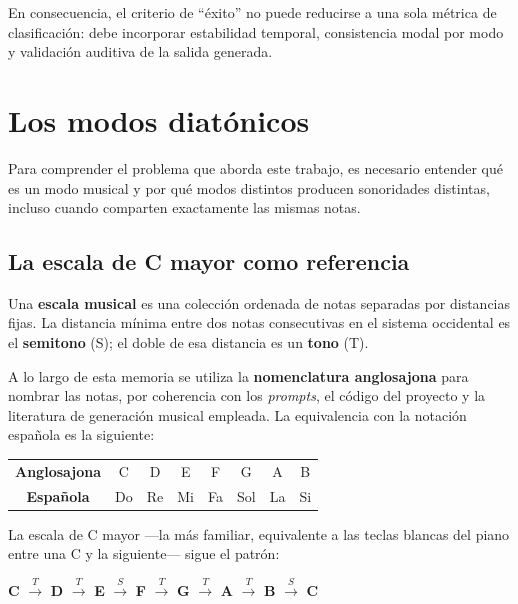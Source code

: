 \documentclass[%
    school=etsisi,%
    type=pfg,%
    degree=61CD,%
]{upm-report}
\begin{document}
En consecuencia, el criterio de ``\'exito'' no puede reducirse a una sola m\'etrica de clasificaci\'on: debe incorporar estabilidad temporal, consistencia modal por modo y validaci\'on auditiva de la salida generada.

\section{Los modos diat\'onicos}
\label{s:modos-diatonicos}

Para comprender el problema que aborda este trabajo, es necesario entender qu\'e es un modo musical y por qu\'e modos distintos producen sonoridades distintas, incluso cuando comparten exactamente las mismas notas.

\subsection{La escala de C mayor como referencia}

Una \textbf{escala musical} es una colecci\'on ordenada de notas separadas por distancias fijas. La distancia m\'inima entre dos notas consecutivas en el sistema occidental es el \textbf{semitono} (S); el doble de esa distancia es un \textbf{tono} (T).

A lo largo de esta memoria se utiliza la \textbf{nomenclatura anglosajona} para nombrar las notas, por coherencia con los \textit{prompts}, el c\'odigo del proyecto y la literatura de generaci\'on musical empleada. La equivalencia con la notaci\'on espa\~nola es la siguiente:

\begin{center}
\begin{tabular}{cccccccc}
\toprule
\textbf{Anglosajona} & C & D & E & F & G & A & B \\
\textbf{Espa\~nola}   & Do & Re & Mi & Fa & Sol & La & Si \\
\bottomrule
\end{tabular}
\end{center}

La escala de C mayor ---la m\'as familiar, equivalente a las teclas blancas del piano entre una C y la siguiente--- sigue el patr\'on:

\begin{center}
\large
\textbf{C} $\xrightarrow{\,T\,}$ \textbf{D} $\xrightarrow{\,T\,}$ \textbf{E} $\xrightarrow{\,S\,}$ \textbf{F} $\xrightarrow{\,T\,}$ \textbf{G} $\xrightarrow{\,T\,}$ \textbf{A} $\xrightarrow{\,T\,}$ \textbf{B} $\xrightarrow{\,S\,}$ \textbf{C}
\end{center}
\end{document}
